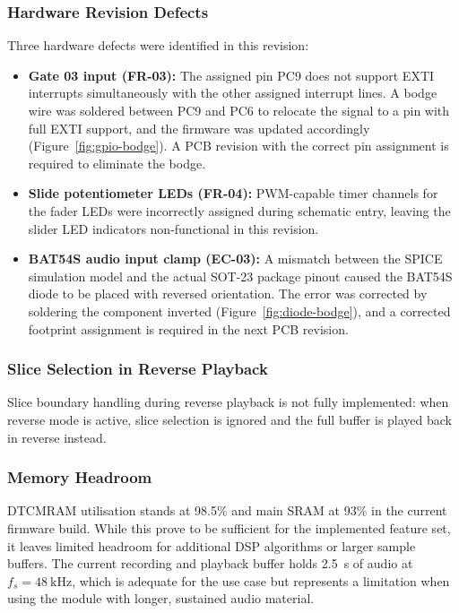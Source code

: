 \vspace{-0.3cm}
\subsubsection{Hardware Revision Defects}
Three hardware defects were identified in this revision:
\begin{itemize}
	\item \textbf{Gate 03 input (FR-03):} The assigned pin PC9 does not support EXTI interrupts simultaneously with the other assigned interrupt lines. A bodge wire was soldered between PC9 and PC6 to relocate the signal to a pin with full EXTI support, and the firmware was updated accordingly (Figure~\ref{fig:gpio-bodge}). A PCB revision with the correct pin assignment is required to eliminate the bodge.
	\item \textbf{Slide potentiometer LEDs (FR-04):} PWM-capable timer channels for the fader LEDs were incorrectly assigned during schematic entry, leaving the slider LED indicators non-functional in this revision.
	\item \textbf{BAT54S audio input clamp (EC-03):} A mismatch between the SPICE simulation model and the actual SOT-23 package pinout caused the BAT54S diode to be placed with reversed orientation. The error was corrected by soldering the component inverted (Figure~\ref{fig:diode-bodge}), and a corrected footprint assignment is required in the next PCB revision.
\end{itemize}

\vspace{-0.1cm}
\subsubsection{Slice Selection in Reverse Playback}
Slice boundary handling during reverse playback is not fully implemented: when reverse mode is active, slice selection is ignored and the full buffer is played back in reverse instead.

\subsubsection{Memory Headroom}
DTCMRAM utilisation stands at 98.5\% and main SRAM at 93\% in the current firmware build.
While this prove to be sufficient for the implemented feature set, it leaves limited headroom for additional DSP algorithms or larger sample buffers.
The current recording and playback buffer holds \qty{2.5}{\second} of audio at $f_s = \qty{48}{\kilo\hertz}$, which is adequate for the use case but represents a limitation when using the module with longer, sustained audio material.


